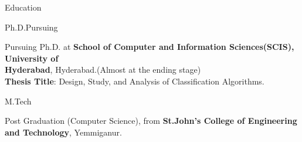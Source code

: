 \documentclass{resume} %
\begin{document}

\begin{rSection}{Education}
	
\begin{rSubsection}{Ph.D.}{Pursuing}{}{}	
	\item Pursuing Ph.D. at \textbf{School of Computer and Information Sciences(SCIS), University of \\ Hyderabad}, Hyderabad.(Almost at the ending stage) \\
	\textbf{Thesis Title}: Design, Study, and Analysis of Classification Algorithms.
\end{rSubsection}

\begin{rSubsection}{M.Tech}{}{}{}%
	\item Post Graduation (Computer Science), from \textbf{St.John's College of Engineering and Technology}, Yemmiganur.
\end{rSubsection}

\end{rSection}


\end{document}
